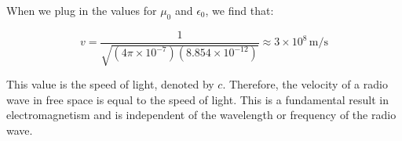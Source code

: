 When we plug in the values for \( \mu_0 \) and \( \epsilon_0 \), we find that:

\[
v = \frac{1}{\sqrt{(4\pi \times 10^{-7}) (8.854 \times 10^{-12})}} \approx 3 \times 10^8 \, \text{m/s}
\]

This value is the speed of light, denoted by \( c \). Therefore, the velocity of a radio wave in free space is equal to the speed of light. This is a fundamental result in electromagnetism and is independent of the wavelength or frequency of the radio wave.

